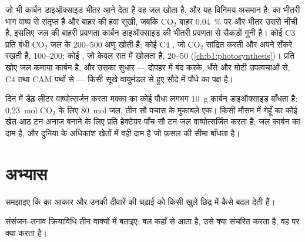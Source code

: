 \begin{proposition}[जल-उपयोग दक्षता]\label{prop:b1:plant-transport:wue}
जो भी  कार्बन डाइऑक्साइड भीतर आने देता है वह जल खोता है, और यह
विनिमय असमान है:  का भीतरी भाग वाष्प से संतृप्त है और बाहर की हवा
सूखी, जबकि $\mathrm{CO_2}$ बाहर \qty{0.04}{\%} पर और भीतर उससे नीची है,
इसलिए जल की बाहरी प्रवणता कार्बन डाइऑक्साइड की भीतरी प्रवणता से सैकड़ों
गुनी है। कोई C3  प्रति बंधी $\mathrm{CO_2}$ जल के
\qtyrange{200}{500}{} अणु खोती है; कोई C4 , जो $\mathrm{CO_2}$
सांद्रित करती और अपने  सँकरे रखती है, \qtyrange{100}{200}{}; कोई , जो केवल रात में खोलता है, \qtyrange{20}{50}{}
(\cref{ch:b1:photosynthesis})। \emph{} प्रति खोए जल कमाया
कार्बन है, और उसका सुधार --- दोपहर में बंद करके, धँसे  और मोटी
उपत्वचाओं से, C4 तथा CAM पथों से --- किसी सूखे वायुमंडल से हुए सौदे में
पौधे का पक्ष है।
\end{proposition}

\begin{example}[अंकों में यह सौदा]\label{ex:b1:plant-transport:bargain}
दिन में डेढ़ लीटर वाष्पोत्सर्जन करता मक्का का कोई पौधा लगभग \qty{10}{g}
कार्बन डाइऑक्साइड बाँधता है: \qty{0.23}{mol} $\mathrm{CO_2}$ के लिए
\qty{80}{mol} जल, तीन सौ पचास के मुकाबले एक। किसी मौसम में गेहूँ का कोई
खेत आठ टन अनाज बनाने के लिए प्रति हेक्टेयर पाँच सौ टन जल वाष्पोत्सर्जित
करता है; जल कार्बन का दाम है, और दुनिया के अधिकांश खेतों में वही दाम है
जो फ़सल की सीमा बाँधता है।
\end{example}

\section{अभ्यास}

\begin{exercise}[$\star$]\label{exo:b1:plant-transport:1}
समझाइए कि  का आकार और उनकी दीवारें  की चढ़ाई को किसी
खुले छिद्र में कैसे बदल देती हैं।
\end{exercise}

\begin{exercise}[$\star$]\label{exo:b1:plant-transport:2}
संसंजन--तनाव क्रियाविधि तीन वाक्यों में बताइए: बल कहाँ से आता है, उसे
क्या संचरित करता है, वह  पर क्या करता है।
\end{exercise}

